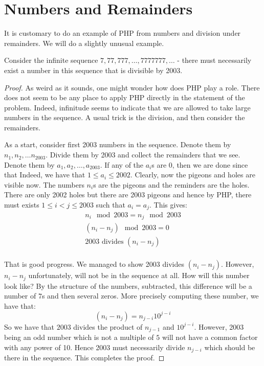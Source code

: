 \section{Numbers and Remainders}

It is customary to do an example of PHP from numbers and division under remainders. We will do a slightly unusual example. 

\begin{theorem}
Consider the infinite sequence $7, 77, 777, \ldots ,7777777, \ldots $ - there must necessarily exist a number in this sequence that is divisible by 2003.
\end{theorem}
\begin{proof}
As weird as it sounds, one might wonder how does PHP play a role. There does not seem to be any place to apply PHP directly in the statement of the problem. Indeed, infinitude seems to indicate that we are allowed to take large numbers in the sequence. A usual trick is the division, and then consider the remainders.

As a start, consider  first 2003 numbers in the sequence. Denote them by $n_1, n_2, \ldots n_{2003}$. Divide them by 2003 and collect the remainders that we see. Denote them by $a_1, a_2, \ldots, a_{2003}$. If any of the $a_i$s are 0, then we are done since that  Indeed, we have that $1 \le a_i \le 2002$. Clearly, now the pigeons and holes are visible now. The numbers $n_i$s are the pigeons and the reminders are the holes. There are only 2002 holes but there are 2003 pigeons and hence by PHP, there must exists $1 \le i < j \le 2003$ such that $a_i = a_j$. This gives:
\begin{eqnarray}
n_i  \mod 2003 = n_j \mod 2003 \\
(n_i - n_j) \mod 2003 =  0\\
2003 \textrm{ divides } (n_i - n_j) \\
\end{eqnarray}

That is good progress. We managed to show 2003 divides $(n_i - n_j)$. However, $n_i - n_j$ unfortunately, will not be in the sequence at all. How will this number look like? By the structure of the numbers, subtracted, this difference will be a number of $7$s and then several zeros. More precisely computing these number, we have that:
$$(n_i - n_j) = n_{j-i} 10^{j-i}$$
So we have that $2003$ divides the product of $n_{j-1}$ and $10^{j-i}$. However, 2003 being an odd number which is not a multiple of $5$ will not have a common factor with any power of 10. Hence 2003 must necessarily divide $n_{j-i}$ which should be there in the sequence. This completes the proof.
\end{proof}

